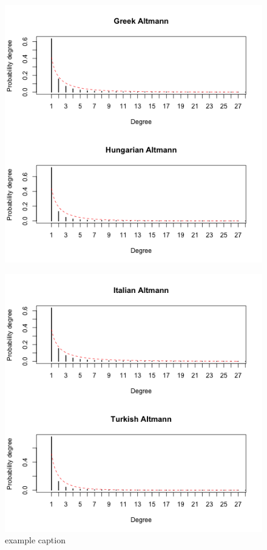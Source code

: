 \documentclass[paper=a4, fontsize=11pt]{scrartcl} %
\theoremstyle{plain}
\begin{document}
\begin{figure}[htbp] %
   \centering
   \includegraphics[width=\textwidth]{Altman_4} %
   \label{fig:example}
\end{figure}

\begin{figure}[htbp] %
   \centering
   \includegraphics[width=\textwidth]{Altman_5} %
   \caption{example caption}
   \label{fig:example}
\end{figure}
\end{document}
